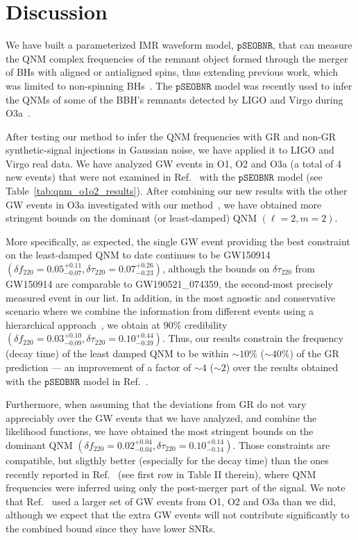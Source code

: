 \documentclass[twocolumn,prd,aps,superscriptaddress,preprintnumbers,tightenlines,showpacs,nofootinbib,eqsecnum,amsfonts,amsmath]{revtex4-1}
\newcommand{\df}[1]{\delta f_{\text{#1}}}
\newcommand{\dtau}[1]{\delta \tau_{\text{#1}}}
\newcommand{\pSEOB}{\texttt{pSEOBNR}}
\begin{document}



\section{Discussion}
\label{sec:discussion}
We have built a parameterized IMR waveform model, $\pSEOB$, that can 
measure the QNM complex frequencies of the remnant object formed through 
the merger of BHs with aligned or antialigned spins, thus extending  
previous work, which was limited to non-spinning BHs~\cite{Brito:2018rfr}. 
The $\pSEOB$ model was recently used to infer the QNMs of some of the 
BBH's remnants detected by LIGO and Virgo during O3a~\cite{Abbott:2020jks}. 

After testing our method to infer the QNM frequencies with GR and non-GR synthetic-signal 
injections in Gaussian noise, we have applied it to LIGO and Virgo real data. 
We have analyzed GW events in O1, O2 and O3a (a total of 4 new events) that were not examined in Ref.~\cite{Abbott:2020jks} 
with the $\pSEOB$ model (see Table~\ref{tab:qnm_o1o2_results}). After combining our new 
results with the other GW events in O3a investigated with our method~\cite{Abbott:2020jks}, 
we have obtained more stringent bounds on the dominant (or least-damped) QNM $(\ell=2,m=2)$.

More specifically, as expected, the single GW event providing the best constraint
on the least-damped QNM to date continues to be GW150914 $(\df{220}=0.05^{+0.11}_{-0.07}, 
\dtau{220}=0.07^{+0.26}_{-0.23})$, although the bounds on 
$\dtau{220}$ from GW150914 are comparable to GW190521\_074359, 
the second-most precisely measured event in our list.
In addition, in the most agnostic and
conservative scenario where we combine the information from different
events using a hierarchical approach~\cite{Zimmerman:2019wzo,Isi:2019asy}, we obtain 
at $90\%$ credibility $(\df{220}=0.03^{+0.10}_{-0.09}, \dtau{220}=0.10^{+0.44}_{-0.39})$. Thus, 
our results constrain the frequency (decay time) of the least damped QNM to be within $\sim
10\%$ ($\sim 40\%$) of the GR prediction --- an improvement of a factor of $\sim 4$ ($\sim 2$) 
over the results obtained with the $\pSEOB$ model in Ref.~\cite{Abbott:2020jks}.

Furthermore, when assuming that the deviations from GR do not vary appreciably over the GW events 
that we have analyzed, and combine the likelihood functions, we have obtained the most stringent bounds  
on the dominant QNM $(\df{220}=0.02^{+0.04}_{-0.04}, \dtau{220}=0.10^{+0.14}_{-0.14})$. Those 
constraints are compatible, but sligthly better (especially for the decay time) than the ones recently reported in Ref.~\cite{Carullo:2021dui} 
(see first row in Table II therein), where QNM frequencies were inferred using only the post-merger part of 
the signal. We note that Ref.~\cite{Carullo:2021dui} used a larger set of GW events from O1, O2 and O3a than we did, although we expect 
that the extra GW events will not contribute significantly to the combined bound since they have lower SNRs.
\end{document}
